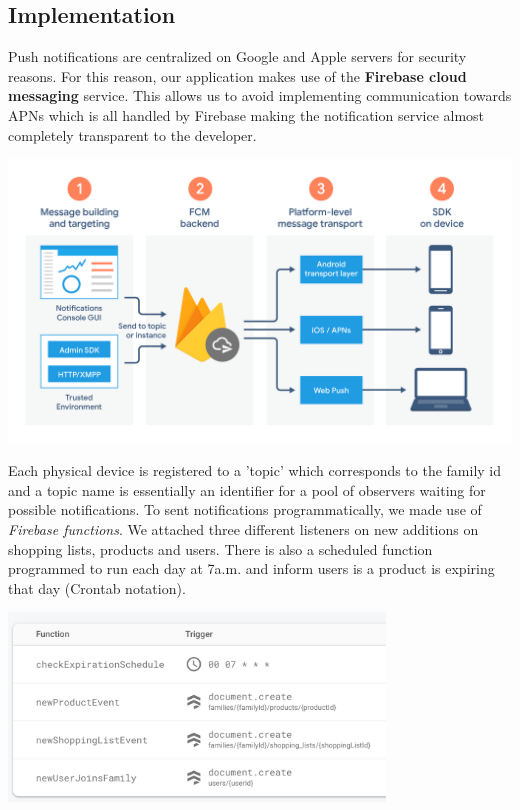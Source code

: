 \subsection{Implementation}
Push notifications are centralized on Google and Apple servers for security reasons. For this reason, our application makes use of the \textbf{Firebase cloud messaging} service. This allows us to avoid implementing communication towards APNs which is all handled by Firebase making the notification service almost completely transparent to the developer.

\hspace*{-1cm}\includegraphics[width=14cm,keepaspectratio]{Images/notifications/diagram-FCM.png}

\noindent Each physical device is registered to a 'topic' which corresponds to the family id and a topic name is essentially an identifier for a pool of observers waiting for possible notifications.
\newline\newline
\noindent To sent notifications programmatically, we made use of \textit{Firebase functions}. We attached three different listeners on new additions on shopping lists, products and users. There is also a scheduled function programmed to run each day at 7a.m. and inform users is a product is expiring that day (Crontab notation).

\vspace*{0.5cm}\includegraphics[width=10cm,keepaspectratio]{Images/notifications/firebase_functions.png}

